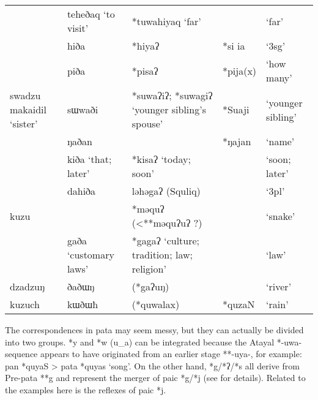\begin{longtable}[c]{>{\raggedright}p{2.7cm}>{\raggedright}p{2.7cm}>{\raggedright}p{2.7cm}ll}
                         & teheðaq `to visit'               & *tuwahiyaq `far'                              &          & `far'             \\
                         & hiða                             & *hiyaʔ                                        & *si ia   & `3\acs{sg}'       \\ \hdashline
                         & piða                             & *pisaʔ                                        & *pija(x) & `how many'        \\
swadzu makaidil `sister' & sɯwaði                           & *suwaʔiʔ; *suwagiʔ `younger sibling's spouse' & *Suaji   & `younger sibling' \\
                         & ŋaðan                            &                                               & *ŋajan   & `name'            \\
                         & kiða `that; later'               & *kisaʔ `today; soon'                          &          & `soon; later'     \\
                         & dahiða                           & ləhəgaʔ (Squliq)                              &          & `3\acs{pl}'       \\
kuzu                     &                                  & *məquʔ (<**məquʔuʔ ?)                         &          & `snake'           \\
                         & gaða `customary laws'            & *gagaʔ `culture; tradition; law; religion'    &          & `law'             \\ \hdashline
dzadzuŋ                  & ðaðɯŋ                            & (*gaʔuŋ)                                      &          & `river'           \\
kuzuch                   & kɯðɯħ                            & (*quwalax)                                    & *quzaN   & `rain'            \\ \hline
\end{longtable}  
\endgroup

The correspondences in \acl{pata} may seem messy, but they can actually be divided into two groups. *y and *w (u\_a) can be integrated because the Atayal *-uwa- sequence appears to have originated from an earlier stage **-uya-, for example: \ac{pan} *quyaS > \ac{pata} *quyas `song'. On the other hand, *g/*ʔ/*s all derive from Pre-\acl{pata} **g and represent the merger of \acl{paic} *g/*j (see \cite{song2023Aicgprime} for details). Related to the examples here is the reflexes of \acl{paic} *j.

